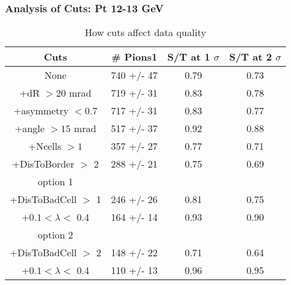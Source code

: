 \frame
{
\frametitle{Analysis of Cuts: Pt 12-13 GeV}
\begin{table}
\caption{How cuts affect data quality}
\centering
\begin{tabular}{c c c c}
\hline\hline
Cuts & \# Pions1 & S/T at 1 $\sigma$ & S/T at 2 $\sigma$ \\ [0.5ex]
\hline
None &  740 +/-   47 & 0.79 & 0.73 \\ %
+dR $> 20$ mrad &  719 +/-   31 & 0.83 & 0.78 \\ %
+asymmetry $< 0.7$ &  717 +/-   31 & 0.83 & 0.77 \\ %
+angle $> 15$ mrad &  517 +/-   37 & 0.92 & 0.88 \\ %
+Ncells $> 1$&  357 +/-   27 & 0.77 & 0.71 \\ %
+DisToBorder $>$ 2 &  288 +/-   21 & 0.75 & 0.69 \\ %
option 1\\
+DisToBadCell $>$ 1&  246 +/-   26 & 0.81 & 0.75 \\ %
+$0.1 < \lambda <$ 0.4 &  164 +/-   14 & 0.93 & 0.90 \\ %
option 2\\
+DisToBadCell $>$ 2&  148 +/-   22 & 0.71 & 0.64 \\ %
+$0.1 < \lambda <$ 0.4 &  110 +/-   13 & 0.96 & 0.95 \\ %
[1ex]
\hline
\end{tabular}
\label{table:nonlin}
\end{table}
}
